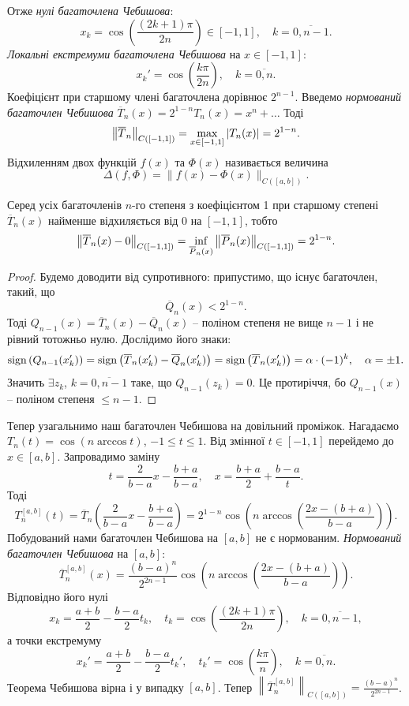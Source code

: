 Отже \textit{нулі багаточлена Чебишова}: \[ x_k = \cos \left( \dfrac{(2k+1)\pi}{2n} \right) \in [-1,1], \quad k=\overline{0,n-1}. \] \textit{Локальні екстремуми багаточлена Чебишова} на $x\in[-1,1]$: \[ x_k' = \cos \left( \dfrac{k\pi}{2n} \right), \quad k=\overline{0,n}.\] Коефіцієнт при старшому члені багаточлена дорівнює $2^{n-1}$. Введемо \textit{нормований багаточлен Чебишова} $\overline{T}_n(x) = 2^{1-n} T_n(x) = x^n + \ldots$ Тоді \[ \left\|\overline{T}_n\right\|_{C([-1,1])} = \displaystyle\max\limits_{x\in[-1,1]} |T_n(x)| = 2^{1-n}. \] Відхиленням двох функцій $f(x)$ та $\Phi(x)$ називається величина  \[ \Delta (f, \Phi) = \| f(x) - \Phi(x)\|_{C([a,b])}. \]
\begin{theorem}[Чебишова]
    Серед усіх багаточленів $n$-го степеня з коефіцієнтом 1 при старшому степені $\overline{T}_n(x)$ найменше відхиляється від 0 на $[-1,1]$, тобто \[ \left\|\overline{T}_n(x) - 0\right\|_{C([-1,1])} = \displaystyle\inf\limits_{\overline{P}_n(x)} \left\|\overline{P}_n(x)\right\|_{C([-1,1])} = 2^{1-n}. \]
\end{theorem}
\begin{proof}
    Будемо доводити від супротивного: припустимо, що існує багаточлен, такий, що \[ \overline{Q}_n(x) < 2^{1-n}.\] Тоді $Q_{n-1}(x) = \overline{T}_n(x) - \overline{Q}_n(x)$ -- поліном степеня не вище $n-1$ і не рівний тотожньо нулю. Дослідимо його знаки: \[ \operatorname{sign}\left(Q_{n-1}(x_k')\right)=\operatorname{sign}\left(\overline{T}_n(x_k')-\overline{Q}_n(x_k')\right)=\operatorname{sign}\left(\overline{T}_n(x_k')\right) = \alpha\cdot(-1)^k, \quad \alpha = \pm 1. \] Значить $\exists z_k$, $k=\overline{0,n-1}$ таке, що $Q_{n-1}(z_k)=0$. Це протиріччя, бо $Q_{n-1}(x)$ -- поліном степеня $\le n - 1$.
\end{proof}
Тепер узагальнимо наш багаточлен Чебишова на довільний проміжок. Нагадаємо $T_n(t) = \cos(n \arccos t)$, $-1 \le t \le 1$. Від змінної $t \in [-1, 1]$ перейдемо до $x \in [a,b]$. Запровадимо заміну \[t = \frac{2}{b-a}x - \frac{b+a}{b-a}, \quad x=\frac{b+a}{2}+\frac{b-a}t.\] Тоді \[ T_n^{[a,b]}(t)=\overline{T}_n\left(\dfrac{2}{b-a}x-\dfrac{b+a}{b-a}\right)=2^{1-n}\cos\left(n\arccos\left(\dfrac{2x-(b+a)}{b-a}\right)\right).\] Побудований нами багаточлен Чебишова на $[a,b]$ не є нормованим. \textit{Нормований багаточлен Чебишова} на $[a,b]$: \[ \overline{T}_n^{[a,b]}(x) = \dfrac{(b-a)^n}{2^{2n-1}}\cos\left(n\arccos\left(\dfrac{2x-(b+a)}{b-a}\right)\right). \] Відповідно його нулі \[x_k = \dfrac{a+b}{2} - \dfrac{b-a}{2}t_k, \quad t_k = \cos\left(\frac{(2k+1)\pi}{2n}\right), \quad k=\overline{0,n-1},\] а точки екстремуму \[ x_k' = \dfrac{a+b}{2} - \dfrac{b-a}{2}t_k', \quad t_k' = \cos\left(\frac{k\pi}{n}\right), \quad k=\overline{0,n}.\] Теорема Чебишова вірна і у випадку $[a,b]$. Тепер $\left\|\overline{T}_n^{[a,b]}\right\|_{C([a,b])} = \frac{(b-a)^n}{2^{2n-1}}$. \\

